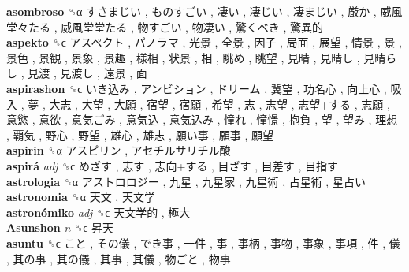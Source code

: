 \textbf{asombroso} ␝α   すさまじい ,  ものすごい ,  凄い ,  凄じい ,  凄まじい ,  厳か ,  威風堂々たる ,  威風堂堂たる ,  物すごい ,  物凄い ,  驚くべき ,  驚異的   \\
\textbf{aspekto} ␝ϲ   アスペクト ,  パノラマ ,  光景 ,  全景 ,  因子 ,  局面 ,  展望 ,  情景 ,  景 ,  景色 ,  景観 ,  景象 ,  景趣 ,  様相 ,  状景 ,  相 ,  眺め ,  眺望 ,  見晴 ,  見晴し ,  見晴らし ,  見渡 ,  見渡し ,  遠景 ,  面   \\
\textbf{aspirashon} ␝ϲ   いき込み ,  アンビション ,  ドリーム ,  冀望 ,  功名心 ,  向上心 ,  吸入 ,  夢 ,  大志 ,  大望 ,  大願 ,  宿望 ,  宿願 ,  希望 ,  志 ,  志望 ,  志望+する ,  志願 ,  意慾 ,  意欲 ,  意気ごみ ,  意気込 ,  意気込み ,  憧れ ,  憧憬 ,  抱負 ,  望 ,  望み ,  理想 ,  覇気 ,  野心 ,  野望 ,  雄心 ,  雄志 ,  願い事 ,  願事 ,  願望   \\
\textbf{aspirin} ␝α   アスピリン ,  アセチルサリチル酸   \\
\textbf{aspirá} \emph{adj}  ␝ϲ   めざす ,  志す ,  志向+する ,  目ざす ,  目差す ,  目指す   \\
\textbf{astrologia} ␝α   アストロロジー ,  九星 ,  九星家 ,  九星術 ,  占星術 ,  星占い   \\
\textbf{astronomia} ␝α   天文 ,  天文学   \\
\textbf{astronómiko} \emph{adj}  ␝ϲ   天文学的 ,  極大   \\
\textbf{Asunshon} \emph{n}  ␝ϲ   昇天   \\
\textbf{asuntu} ␝ϲ   こと ,  その儀 ,  でき事 ,  一件 ,  事 ,  事柄 ,  事物 ,  事象 ,  事項 ,  件 ,  儀 ,  其の事 ,  其の儀 ,  其事 ,  其儀 ,  物ごと ,  物事   \\
